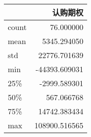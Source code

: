 \begin{tabular}{lr}
\toprule
{} &             认购期权 \\
\midrule
count &      76.000000 \\
mean  &    5345.294050 \\
std   &   22776.701639 \\
min   &  -44393.609031 \\
25\%   &   -2999.589301 \\
50\%   &     567.066768 \\
75\%   &   14742.383434 \\
max   &  108900.516565 \\
\bottomrule
\end{tabular}
